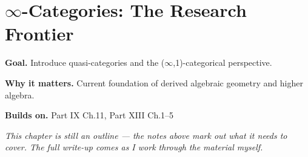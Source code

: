 \chapter{$\infty$-Categories: The Research Frontier}
\label{ch:13-category-theory-and-universal-structures-12}

\begin{chapterintro}
\textbf{Goal.} Introduce quasi-categories and the ($\infty$,1)-categorical perspective.

\textbf{Why it matters.} Current foundation of derived algebraic geometry and higher algebra.

\textbf{Builds on.} Part IX Ch.11, Part XIII Ch.1–5
\end{chapterintro}

\textit{This chapter is still an outline --- the notes above mark out what it needs to cover. The full write-up comes as I work through the material myself.}
